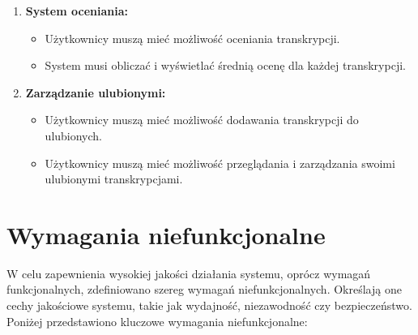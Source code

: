 \documentclass[a4paper,twoside,12pt]{book}
\begin{document}
\begin{enumerate}
	\item \textbf{System oceniania:}
	      \begin{itemize}
	      	\item Użytkownicy muszą mieć możliwość oceniania transkrypcji.
	      	\item System musi obliczać i wyświetlać średnią ocenę dla każdej transkrypcji.
	      \end{itemize}
	          
	\item \textbf{Zarządzanie ulubionymi:}
	      \begin{itemize}
	      	\item Użytkownicy muszą mieć możliwość dodawania transkrypcji do ulubionych.
	      	\item Użytkownicy muszą mieć możliwość przeglądania i zarządzania swoimi ulubionymi transkrypcjami.
	      \end{itemize}
\end{enumerate}

\section{Wymagania niefunkcjonalne}

W celu zapewnienia wysokiej jakości działania systemu, oprócz wymagań funkcjonalnych, zdefiniowano szereg wymagań niefunkcjonalnych. Określają one cechy jakościowe systemu, takie jak wydajność, niezawodność czy bezpieczeństwo. Poniżej przedstawiono kluczowe wymagania niefunkcjonalne:
\end{document}
